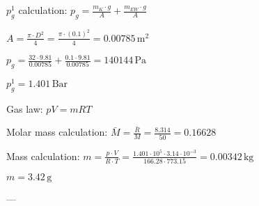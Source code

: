 \( p_g^1 \) calculation:  
\( p_g = \frac{m_K \cdot g}{A} + \frac{m_{EW} \cdot g}{A} \)  

\( A = \frac{\pi \cdot D^2}{4} = \frac{\pi \cdot (0.1)^2}{4} = 0.00785 \, \text{m}^2 \)  

\( p_g = \frac{32 \cdot 9.81}{0.00785} + \frac{0.1 \cdot 9.81}{0.00785} = 140144 \, \text{Pa} \)  

\( p_g^1 = 1.401 \, \text{Bar} \)  

Gas law:  
\( pV = mRT \)  

Molar mass calculation:  
\( \bar{M} = \frac{\bar{R}}{M} = \frac{8.314}{50} = 0.16628 \)  

Mass calculation:  
\( m = \frac{p \cdot V}{R \cdot T} = \frac{1.401 \cdot 10^5 \cdot 3.14 \cdot 10^{-3}}{166.28 \cdot 773.15} = 0.00342 \, \text{kg} \)  

\( m = 3.42 \, \text{g} \)  

---